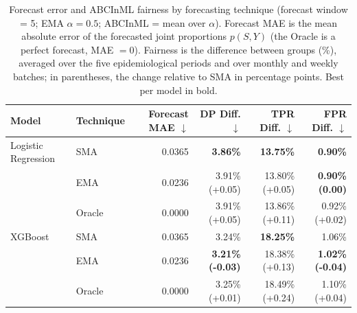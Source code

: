 \begin{table}
  \small
  \caption{Forecast error and ABCInML fairness by forecasting technique (forecast window = 5; EMA $\alpha=0.5$; ABCInML = mean over $\alpha$). Forecast MAE is the mean absolute error of the forecasted joint proportions $p(S,Y)$ (the Oracle is a perfect forecast, MAE $=0$). Fairness is the difference between groups (\%), averaged over the five epidemiological periods and over monthly and weekly batches; in parentheses, the change relative to SMA in percentage points. Best per model in bold.}
  \label{tab:forecast-error-fairness}
  \begin{tabular}{llrrrr}
    \toprule
    Model & Technique & Forecast MAE $\downarrow$ & DP Diff. $\downarrow$ & TPR Diff. $\downarrow$ & FPR Diff. $\downarrow$ \\
    \midrule
    Logistic Regression & SMA & 0.0365 & \textbf{3.86\%} & \textbf{13.75\%} & \textbf{0.90\%} \\
     & EMA & 0.0236 & 3.91\% (+0.05) & 13.80\% (+0.05) & \textbf{0.90\% (0.00)} \\
     & Oracle & 0.0000 & 3.91\% (+0.05) & 13.86\% (+0.11) & 0.92\% (+0.02) \\
    \midrule
    XGBoost & SMA & 0.0365 & 3.24\% & \textbf{18.25\%} & 1.06\% \\
     & EMA & 0.0236 & \textbf{3.21\% (-0.03)} & 18.38\% (+0.13) & \textbf{1.02\% (-0.04)} \\
     & Oracle & 0.0000 & 3.25\% (+0.01) & 18.49\% (+0.24) & 1.10\% (+0.04) \\
    \bottomrule
  \end{tabular}
\end{table}
